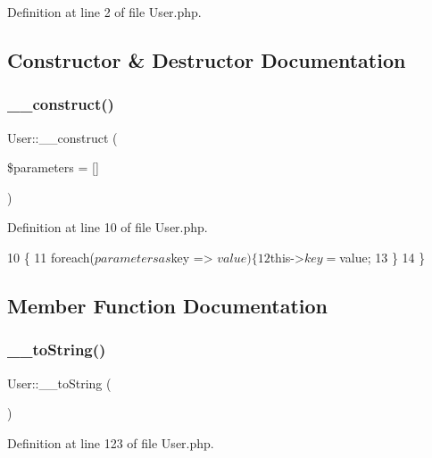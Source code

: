 Definition at line 2 of file User.\+php.



\subsection{Constructor \& Destructor Documentation}
\hypertarget{class_user_ae8aeb1b25337214f485072dcfd3838bf}{}\label{class_user_ae8aeb1b25337214f485072dcfd3838bf} 
\subsubsection{\texorpdfstring{\+\_\+\+\_\+construct()}{\_\_construct()}}
{\footnotesize\ttfamily User\+::\+\_\+\+\_\+construct (\begin{DoxyParamCaption}\item[{}]{\$parameters = {\ttfamily \mbox{[}\mbox{]}} }\end{DoxyParamCaption})}



Definition at line 10 of file User.\+php.


\begin{DoxyCode}
10                                                   \{
11         \textcolor{keywordflow}{foreach}($parameters as $key => $value) \{
12             $this->$key = $value;
13         \}
14     \}
\end{DoxyCode}


\subsection{Member Function Documentation}
\hypertarget{class_user_ab3d7e8f713f819b4121fb0bc38523c12}{}\label{class_user_ab3d7e8f713f819b4121fb0bc38523c12} 
\subsubsection{\texorpdfstring{\+\_\+\+\_\+to\+String()}{\_\_toString()}}
{\footnotesize\ttfamily User\+::\+\_\+\+\_\+to\+String (\begin{DoxyParamCaption}{ }\end{DoxyParamCaption})}



Definition at line 123 of file User.\+php.



